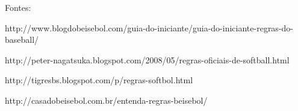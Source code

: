 Fontes:

http://www.blogdobeisebol.com/guia-do-iniciante/guia-do-iniciante-regras-do-baseball/


http://peter-nagatsuka.blogspot.com/2008/05/regras-oficiais-de-softball.html


http://tigresbs.blogspot.com/p/regras-softbol.html


http://casadobeisebol.com.br/entenda-regras-beisebol/


